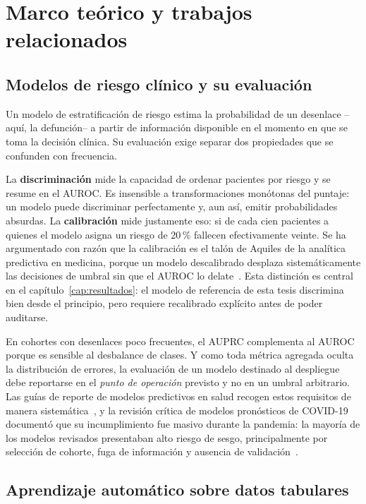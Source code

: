 \chapter{Marco teórico y trabajos relacionados}
\label{cap:marco}

\section{Modelos de riesgo clínico y su evaluación}

Un modelo de estratificación de riesgo estima la probabilidad de un desenlace
--aquí, la defunción-- a partir de información disponible en el momento en que se
toma la decisión clínica. Su evaluación exige separar dos propiedades que se
confunden con frecuencia.

La \textbf{discriminación} mide la capacidad de ordenar pacientes por riesgo y se
resume en el AUROC. Es insensible a transformaciones monótonas del puntaje: un
modelo puede discriminar perfectamente y, aun así, emitir probabilidades
absurdas. La \textbf{calibración} mide justamente eso: si de cada cien pacientes
a quienes el modelo asigna un riesgo de 20\,\% fallecen efectivamente veinte. Se
ha argumentado con razón que la calibración es el talón de Aquiles de la
analítica predictiva en medicina, porque un modelo descalibrado desplaza
sistemáticamente las decisiones de umbral sin que el AUROC lo
delate~\parencite{vancalster2019}. Esta distinción es central en el
capítulo~\ref{cap:resultados}: el modelo de referencia de esta tesis discrimina
bien desde el principio, pero requiere recalibrado explícito antes de poder
auditarse.

En cohortes con desenlaces poco frecuentes, el AUPRC complementa al AUROC porque
es sensible al desbalance de clases. Y como toda métrica agregada oculta la
distribución de errores, la evaluación de un modelo destinado al despliegue debe
reportarse en el \emph{punto de operación} previsto y no en un umbral arbitrario.
Las guías de reporte de modelos predictivos en salud recogen estos requisitos de
manera sistemática~\parencite{tripod2015}, y la revisión crítica de modelos
pronósticos de COVID-19 documentó que su incumplimiento fue masivo durante la
pandemia: la mayoría de los modelos revisados presentaban alto riesgo
de sesgo, principalmente por selección de cohorte, fuga de información y ausencia
de validación~\parencite{wynants2020}.

\section{Aprendizaje automático sobre datos tabulares}

